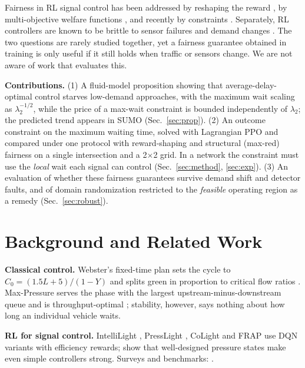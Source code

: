 \documentclass{article}
\begin{document}
Fairness in RL signal control has been addressed by reshaping the reward
\cite{RaeisL21,YanZBB20,YeDWZWC23}, by multi-objective welfare functions \cite{SiddiqueWZ20},
and recently by constraints \cite{HaydariAZC25,SatheeshP25}. Separately, RL controllers are
known to be brittle to sensor failures and demand changes \cite{RodriguesA19,TanSS20,AultS21,MeiLSW23}.
The two questions are rarely studied together, yet a fairness guarantee obtained in training
is only useful if it still holds when traffic or sensors change. We are not aware of work
that evaluates this.

\textbf{Contributions.}
(1) A fluid-model proposition showing that average-delay-optimal control starves low-demand
approaches, with the maximum wait scaling as $\lambda_2^{-1/2}$, while the price of a max-wait
constraint is bounded independently of $\lambda_2$; the predicted trend appears in SUMO
(Sec.~\ref{sec:prop}).
(2) An outcome constraint on the maximum waiting time, solved with Lagrangian PPO and compared
under one protocol with reward-shaping and structural (max-red) fairness on a single
intersection and a 2$\times$2 grid. In a network the constraint must use the \emph{local}
wait each signal can control (Sec.~\ref{sec:method}, \ref{sec:exp}).
(3) An evaluation of whether these fairness guarantees survive demand shift and detector
faults, and of domain randomization restricted to the \emph{feasible} operating region as a
remedy (Sec.~\ref{sec:robust}).

\section{Background and Related Work}
\textbf{Classical control.} Webster's fixed-time plan sets the cycle to
$C_0=(1.5L+5)/(1-Y)$ and splits green in proportion to critical flow ratios \cite{Webster58}.
Max-Pressure serves the phase with the largest upstream-minus-downstream queue and is
throughput-optimal \cite{Varaiya13,TassiulasE92}; stability, however, says nothing about how
long an individual vehicle waits.

\textbf{RL for signal control.} IntelliLight \cite{WeiZYL18}, PressLight \cite{WeiCZWGXL19},
CoLight \cite{WeiXZZZCZZXL19} and FRAP \cite{ZhengXZFWZLXL19} use DQN variants with
efficiency rewards; \citet{ZhangWSLDW22} show that well-designed pressure states make even
simple controllers strong. Surveys and benchmarks: \cite{WeiZGL19survey,AultS21}.
\end{document}

